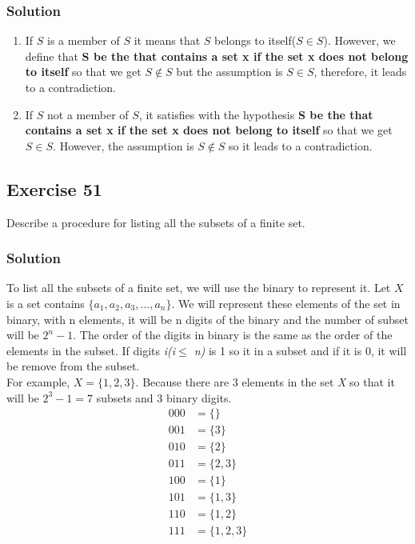 \documentclass{article}
\theoremstyle{mytheoremstyle}
\theoremstyle{mytheoremstyle}
\theoremstyle{myproblemstyle}
\begin{document}
    \subsubsection*{Solution}
        \begin{enumerate} [label = (\alph*)]
            \item If \(S\) is a member of \(S\) it means that \(S\) belongs to itself(\(S \in S\)). However, we define that \textbf{S be the that contains a set x if the set x does
            not belong to itself} so that we get \(S \notin S\) but the assumption is \(S \in S\), therefore, it leads to a contradiction.
            \item If \(S\) not a member of \(S\), it satisfies with the hypothesis \textbf{S be the that contains a set x if the set x does
            not belong to itself} so that we get \(S \in S\). However, the assumption is \(S \notin S\) so it leads to a contradiction.
        \end{enumerate}
    \subsection*{Exercise 51}
        Describe a procedure for listing all the subsets of a finite set.
    \subsubsection*{Solution}
        To list all the subsets of a finite set, we will use the binary to represent it. Let \(X\) is a set contains
        \(\{a_1, a_2, a_3, ..., a_n\}\). We will represent these elements of the set in binary, with n elements, it will be 
        n digits of the binary and the number of subset will be \(2^n - 1\). The order of the digits in binary is the same as
        the order of the elements in the subset. If digits \textit{i(i\(\leqslant\) n)} is 1 so it in a subset and if it is 0, it will be remove from the subset.\\
        
        For example, \(X = \{1, 2, 3\}\). Because there are 3 elements in the set \textit{X} so that it will be \(2^3 - 1 = 7\) subsets and 3 binary digits.
        \begin{align*}
            000 &= \{\}\\
            001 &= \{3\}\\
            010 &= \{2\}\\
            011 &= \{2, 3\}\\
            100 &= \{1\}\\
            101 &= \{1, 3\}\\
            110 &= \{1, 2\}\\
            111 &= \{1, 2, 3\}
        \end{align*}
\end{document}
